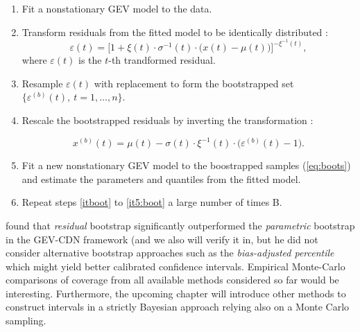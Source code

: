 \begin{enumerate}
	\item\label{itboot} Fit a nonstationary GEV model to the data.
	\item Transform residuals from the fitted model to be identically distributed :
	\begin{equation*}
	\varepsilon(t)=\bigg[1+\xi(t)\cdot\sigma^{-1}(t)\cdot\Big(x(t)-\mu(t)\Big)\bigg]^{-\xi^{-1}(t)},
	\end{equation*}
	where $\varepsilon(t)$ is the $t$-th trandformed residual.
	
	\item Resample $\varepsilon(t)$ with replacement to form the bootstrapped set $\Big\{\varepsilon^{(b)}(t), \ t=1,\ldots,n\Big\}$.
	
	\item Rescale the bootstrapped residuals by inverting the transformation : 
	
	\begin{equation}\label{eq:boots}
	x^{(b)}(t)=\mu(t)-\sigma(t)\cdot\xi^{-1}(t)\cdot\Big(\varepsilon^{(b)}(t)-1\Big).
	\end{equation}
	\item\label{it5:boot} Fit a new nonstationary GEV  model to the boostrapped samples (\ref{eq:boots}) and estimate the parameters and quantiles from the fitted model. 
	\item Repeat steps \ref{itboot} to \ref{it5:boot} a large number of times B.
	
\end{enumerate}
\citet{cannon_flexible_2010} found that \emph{residual} bootstrap significantly outperformed the \emph{parametric} bootstrap in the GEV-CDN framework (and we also will verify it in, but he did not consider alternative bootstrap approaches such as the \emph{bias-adjusted percentile} which might yield better calibrated confidence intervals.
Empirical Monte-Carlo comparisons of coverage from all available methods considered so far would be interesting. Furthermore, the upcoming chapter will introduce other methods to construct intervals in a strictly Bayesian approach  relying also on a Monte Carlo sampling.
